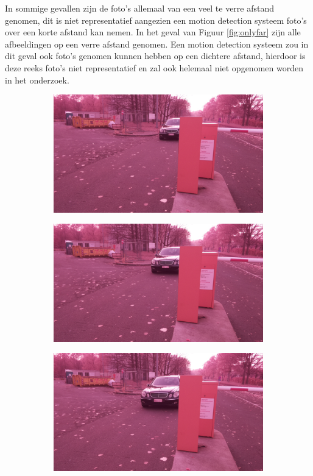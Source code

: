 In sommige gevallen zijn de foto's allemaal van een veel te verre afstand genomen, dit is niet representatief aangezien een motion detection systeem foto's over een korte afstand kan nemen. In het geval van Figuur \ref{fig:onlyfar} zijn alle afbeeldingen op een verre afstand genomen. Een motion detection systeem zou in dit geval ook foto's genomen kunnen hebben op een dichtere afstand, hierdoor is deze reeks foto's niet representatief en zal ook helemaal niet opgenomen worden in het onderzoek.
\begin{figure}[h!]
	\centering
	\begin{subfigure}[b]{0.45\linewidth}
		\includegraphics[width=\linewidth]{img/slecht/onlyfar1.jpg}
	\end{subfigure}
	\begin{subfigure}[b]{0.45\linewidth}
		\includegraphics[width=\linewidth]{img/slecht/onlyfar2.jpg}
	\end{subfigure}
	\begin{subfigure}[b]{0.45\linewidth}
		\includegraphics[width=\linewidth]{img/slecht/onlyfar3.jpg}

\end{subfigure}
\end{figure}
